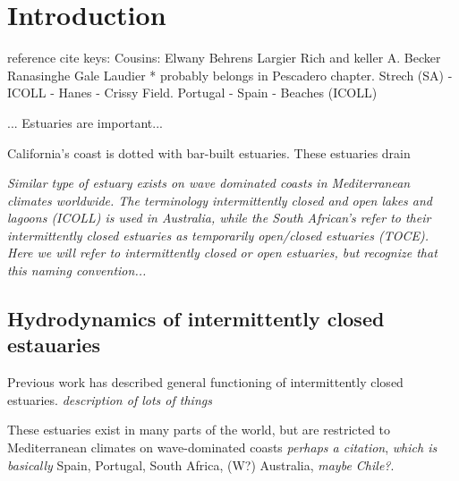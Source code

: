 \chapter{Introduction}
\label{chIntro}

reference cite keys:
Cousins: \cite{cousins_effects_2010,cousins_hydrodynamics_2011}
Elwany \cite{elwany_opening_1998}
Behrens \cite{behrens_characterization_2009,behrens_episodic_2013}
Largier \cite{largier_structure_1986,slinger_evolution_1990,largier_circulation_1991,largier_dynamics_1991,largier_stratified_1992,largier_tidal_1992,largier_seasonally_1997}
Rich and keller \cite{rich_hydrologic_2013}
A. Becker \cite{becker_artificial_2009}
Ranasinghe \cite{ranasinghe_flushing_1998,ranasinghe_circulation_1999,ranasinghe_morphodynamic_1999,ranasinghe_seasonal_2003}
Gale \cite{gale_vertical_2006,gale_processes_2007}
Laudier \cite{laudier_measured_2011} * probably belongs in Pescadero chapter.
Strech (SA) - \cite{stretch_breaching_2006,parkinson_breaching_2007}
ICOLL - \cite{haines_morphometric_2006,baldock_morphodynamic_2008,davidson_simple_2009}
Hanes - Crissy Field. \cite{hanes_waves_2011}
Portugal - \cite{fortunato_morphological_2014}
Spain - \cite{moreno_morphodynamics_2010}
\cite{uncles_infragravity_2014}
Beaches (ICOLL)  \cite{weir_beach_2006}

... Estuaries are important... 


California's coast is dotted with bar-built estuaries.  These estuaries drain 


\emph{Similar type of estuary exists on wave dominated coasts in Mediterranean climates worldwide. The terminology intermittently closed and open lakes and lagoons (ICOLL) is used in Australia, while the South African's refer to their intermittently closed estuaries as temporarily open/closed estuaries (TOCE).  Here we will refer to intermittently closed or open estuaries, but recognize that this naming convention... }

\section{Hydrodynamics of intermittently closed estauaries}
Previous work has described general functioning of intermittently closed estuaries.  
\emph{description of lots of things}

These estuaries exist in many parts of the world, but are restricted to Mediterranean climates on wave-dominated coasts \emph{perhaps a citation}, \emph{which is basically} Spain, Portugal, South Africa, (W?) Australia, \emph{maybe Chile?}. 

